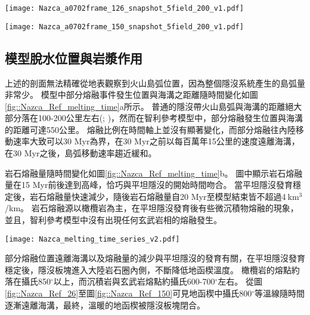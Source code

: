 \begin{figure*}[htp]
    \centering
    \texttt{[image: Nazca\_a0702frame\_126\_snapshot\_5field\_200\_v1.pdf]}
    \caption[智利參考模型於25 Myr時之結果]{智利參考模型於25 Myr時之結果。}
    \label{fig::Nazca_Ref_126}
\end{figure*}


\begin{figure*}[htp]
    \centering
    \texttt{[image: Nazca\_a0702frame\_150\_snapshot\_5field\_200\_v1.pdf]}
    \caption[智利參考模型於30 Myr時之結果]{智利參考模型於30 Myr時之結果。}
    \label{fig::Nazca_Ref_150}
\end{figure*}
\newpage
\subsection{模型脫水位置與岩漿作用}
上述的剖面無法精確從地表觀察到火山島弧位置，因為整個隱沒系統產生的島弧量非常少。
模型中部分熔融事件發生位置與海溝之距離隨時間變化如圖\ref{fig::Nazca_Ref_melting_time}a所示。
普通的隱沒帶火山島弧與海溝的距離絕大部分落在100-200公里左右(\citealp{peacock1990fluid}; \citealp{hyndman2003serpentinization})，然而在智利參考模型中，部分熔融發生位置與海溝的距離可達550公里。
熔融比例在時間軸上並沒有顯著變化，而部分熔融往內陸移動速率大致可以30 Myr為界，在30 Myr之前以每百萬年15公里的速度遠離海溝，在30 Myr之後，島弧移動速率趨近緩和。

岩石熔融量隨時間變化如圖\ref{fig::Nazca_Ref_melting_time}b。
圖中顯示岩石熔融量在15 Myr前後達到高峰，恰巧與平坦隱沒的開始時間吻合。
當平坦隱沒發育穩定後，岩石熔融量快速減少，隨後岩石熔融量自20 Myr至模型結束皆不超過4$\ $km$^3$/km。
岩石熔融源以橄欖岩為主，在平坦隱沒發育後有些微沉積物熔融的現象，並且，智利參考模型中沒有出現任何玄武岩相的熔融發生。

\begin{figure*}[h]
    \centering
    \texttt{[image: Nazca\_melting\_time\_series\_v2.pdf]}
    \caption[智利參考模型岩漿作用隨時間變化]{智利參考模型岩漿作用隨時間變化，灰色底標出平坦隱沒發育後時間段。(a)部分熔融與海溝之距離隨時間變化圖，縱軸中每個點代表每次部分熔融發生位置，顏色為指數上的部分熔融比例。(b)岩石熔融量隨時間變化圖，熔融量單位為每20萬年瞬時每單位海溝之立方公里量。顏色代表不同岩相。(c)岩漿庫體積隨時間變化圖，岩漿庫單位為每單位海溝之立方公里量。顏色代表該時間中最大部分熔融發生量的所在深度。}
    \label{fig::Nazca_Ref_melting_time}
\end{figure*}

部分熔融位置遠離海溝以及熔融量的減少與平坦隱沒的發育有關，在平坦隱沒發育穩定後，隱沒板塊進入大陸岩石圈內側，不斷降低地函楔溫度。
橄欖岩的熔點約落在攝氏850$^{\circ}$以上，而沉積岩與玄武岩熔點約攝氏600-700$^{\circ}$左右。
從圖\ref{fig::Nazca_Ref_26}至圖\ref{fig::Nazca_Ref_150}可見地函楔中攝氏800$^{\circ}$等溫線隨時間逐漸遠離海溝，最終，溫暖的地函楔被隱沒板塊閉合。

